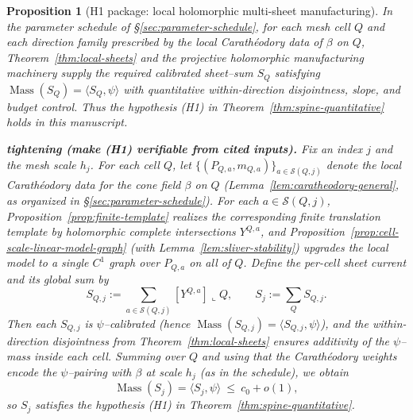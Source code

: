 \documentclass[11pt]{article}
\numberwithin{equation}{section}  %
\theoremstyle{plain}
\newtheorem{proposition}[theorem]{Proposition}
\theoremstyle{definition}
\theoremstyle{remark}
\DeclareMathOperator{\Mass}{Mass}
\begin{document}
\begin{proposition}[H1 package: local holomorphic multi-sheet manufacturing]\label{prop:h1-package}
In the parameter schedule of \S\ref{sec:parameter-schedule}, for each mesh cell $Q$ and each direction family prescribed by the local Carath\'eodory data of $\beta$ on $Q$,
Theorem~\ref{thm:local-sheets} and the projective holomorphic manufacturing machinery supply the required calibrated sheet--sum $S_Q$ satisfying $\Mass(S_Q)=\langle S_Q,\psi\rangle$
with quantitative within-direction disjointness, slope, and budget control.  Thus the hypothesis \textnormal{(H1)} in Theorem~\ref{thm:spine-quantitative} holds in this manuscript.


\noindent\textbf{tightening (make \textnormal{(H1)} verifiable from cited inputs).}
Fix an index $j$ and the mesh scale $h_j$.
For each cell $Q$, let $\{(P_{Q,a},m_{Q,a})\}_{a\in\mathcal S(Q,j)}$ denote the local Carath\'eodory data for the cone field $\beta$ on $Q$
(Lemma~\ref{lem:caratheodory-general}, as organized in \S\ref{sec:parameter-schedule}).
For each $a\in\mathcal S(Q,j)$, Proposition~\ref{prop:finite-template} realizes the corresponding finite translation template by holomorphic
complete intersections $Y^{Q,a}$, and Proposition~\ref{prop:cell-scale-linear-model-graph} (with Lemma~\ref{lem:sliver-stability})
upgrades the local model to a single $C^1$ graph over $P_{Q,a}$ on all of $Q$.
Define the per-cell sheet current and its global sum by
\[
S_{Q,j}:=\sum_{a\in\mathcal S(Q,j)} [Y^{Q,a}]\llcorner Q,
\qquad
S_j:=\sum_Q S_{Q,j}.
\]
Then each $S_{Q,j}$ is $\psi$--calibrated (hence $\Mass(S_{Q,j})=\langle S_{Q,j},\psi\rangle$), and the within-direction disjointness
from Theorem~\ref{thm:local-sheets} ensures additivity of the $\psi$--mass inside each cell.
Summing over $Q$ and using that the Carath\'eodory weights encode the $\psi$--pairing with $\beta$ at scale $h_j$
(as in the schedule), we obtain
\[
\Mass(S_j)=\langle S_j,\psi\rangle\ \le\ c_0+o(1),
\]
so $S_j$ satisfies the hypothesis \textnormal{(H1)} in Theorem~\ref{thm:spine-quantitative}.

\end{proposition}
\end{document}
